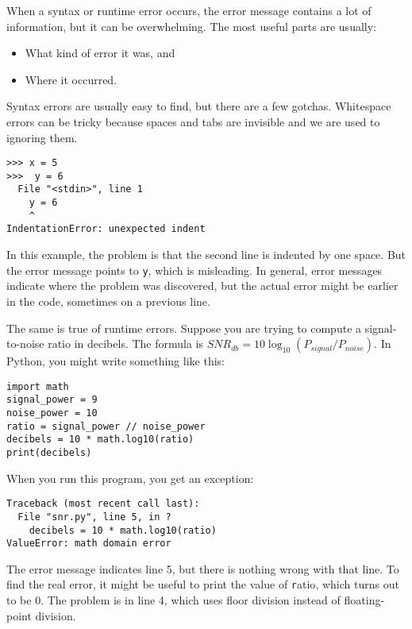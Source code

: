 \documentclass[
DIV=11,
fontsize=12,
twoside,
headinclude=false,
titlepage=firstiscover,
abstract=true,
headsepline=true,
footsepline=true,
chapterprefix=true, %
headings=big,
bibliography=totoc,%
captions=tableheading
]{scrbook}
\theoremstyle{definition}
\begin{document}
When a syntax or runtime error occurs, the error message contains
a lot of information, but it can be overwhelming.  The most
useful parts are usually:

\begin{itemize}

\item What kind of error it was, and

\item Where it occurred.

\end{itemize}

Syntax errors are usually easy to find, but there are a few
gotchas.  Whitespace errors can be tricky because spaces and
tabs are invisible and we are used to ignoring them.

\begin{lstlisting}
>>> x = 5
>>>  y = 6
  File "<stdin>", line 1
    y = 6
    ^
IndentationError: unexpected indent
\end{lstlisting}
%
In this example, the problem is that the second line is indented by
one space.  But the error message points to {\texttt y}, which is
misleading.  In general, error messages indicate where the problem was
discovered, but the actual error might be earlier in the code,
sometimes on a previous line.

The same is true of runtime errors.  Suppose you are trying
to compute a signal-to-noise ratio in decibels.  The formula
is $SNR_{db} = 10 \log_{10} (P_{signal} / P_{noise})$.  In Python,
you might write something like this:

\begin{lstlisting}
import math
signal_power = 9
noise_power = 10
ratio = signal_power // noise_power
decibels = 10 * math.log10(ratio)
print(decibels)
\end{lstlisting}
%
When you run this program, you get an exception:
%

\begin{lstlisting}
Traceback (most recent call last):
  File "snr.py", line 5, in ?
    decibels = 10 * math.log10(ratio)
ValueError: math domain error
\end{lstlisting}
%
The error message indicates line 5, but there is nothing
wrong with that line.  To find the real error, it might be
useful to print the value of {\texttt ratio}, which turns out to
be 0.  The problem is in line 4, which uses floor division
instead of floating-point division.
\end{document}
